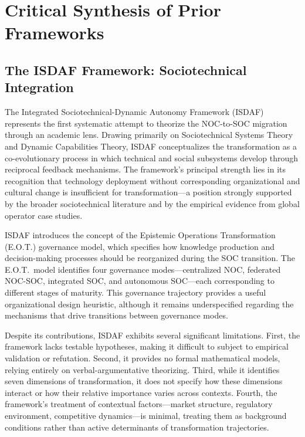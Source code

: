 \documentclass[12pt,a4paper]{article}
\begin{document}
\section{Critical Synthesis of Prior Frameworks}

\subsection{The ISDAF Framework: Sociotechnical Integration}

The Integrated Sociotechnical-Dynamic Autonomy Framework (ISDAF) represents the first systematic attempt to theorize the NOC-to-SOC migration through an academic lens. Drawing primarily on Sociotechnical Systems Theory and Dynamic Capabilities Theory, ISDAF conceptualizes the transformation as a co-evolutionary process in which technical and social subsystems develop through reciprocal feedback mechanisms. The framework's principal strength lies in its recognition that technology deployment without corresponding organizational and cultural change is insufficient for transformation---a position strongly supported by the broader sociotechnical literature \citep{bostrom1977mis} and by the empirical evidence from global operator case studies.

ISDAF introduces the concept of the Epistemic Operations Transformation (E.O.T.) governance model, which specifies how knowledge production and decision-making processes should be reorganized during the SOC transition. The E.O.T.\ model identifies four governance modes---centralized NOC, federated NOC-SOC, integrated SOC, and autonomous SOC---each corresponding to different stages of maturity. This governance trajectory provides a useful organizational design heuristic, although it remains underspecified regarding the mechanisms that drive transitions between governance modes.

Despite its contributions, ISDAF exhibits several significant limitations. First, the framework lacks testable hypotheses, making it difficult to subject to empirical validation or refutation. Second, it provides no formal mathematical models, relying entirely on verbal-argumentative theorizing. Third, while it identifies seven dimensions of transformation, it does not specify how these dimensions interact or how their relative importance varies across contexts. Fourth, the framework's treatment of contextual factors---market structure, regulatory environment, competitive dynamics---is minimal, treating them as background conditions rather than active determinants of transformation trajectories.
\end{document}
